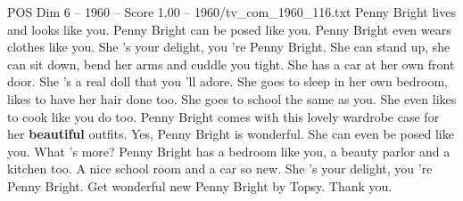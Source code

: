\begin{textsample}{POS Dim 6 – 1960 – Score 1.00 – 1960/tv\_com\_1960\_116.txt}  \label{ex:f6_pos_029}
Penny Bright lives and looks like you.
Penny Bright can be posed like you.
Penny Bright even wears clothes like you.
She 's your delight, you 're Penny Bright.
She can stand up, she can sit down, bend her arms and cuddle you tight.
She has a car at her own front door.
She 's a real doll that you 'll adore.
She goes to sleep in her own bedroom, likes to have her hair done too.
She goes to school the same as you.
She even likes to cook like you do too.
Penny Bright comes with this lovely wardrobe case for her \textbf{beautiful} outfits.
Yes, Penny Bright is wonderful.
She can even be posed like you.
What 's more?
Penny Bright has a bedroom like you, a beauty parlor and a kitchen too.
A nice school room and a car so new.
She 's your delight, you 're Penny Bright.
Get wonderful new Penny Bright by Topsy.
Thank you.

\end{textsample}
